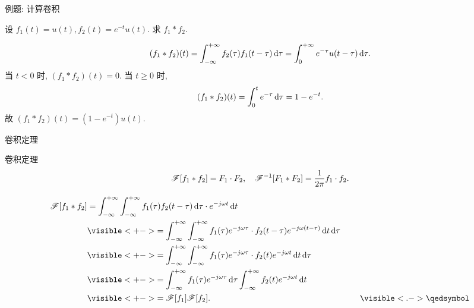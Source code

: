 \begin{frame}{例题: 计算卷积}
\begin{example}
设 $f_1(t)=u(t),f_2(t)=e^{-t}u(t)$.
求 $f_1\ast f_2$.
\end{example}
\begin{solution}
\vspace{-\baselineskip}
\[(f_1\ast f_2)(t)=\int_{-\infty}^{+\infty} f_2(\tau)f_1(t-\tau)\,\mathrm{d} \tau=\int_0^{+\infty} e^{-\tau}u(t-\tau)\,\mathrm{d} \tau.\]
\onslide<+->
当 $t<0$ 时, $(f_1\ast f_2)(t)=0$.
\onslide<+->
当 $t\ge0$ 时, 
\[(f_1\ast f_2)(t)=\int_0^t e^{-\tau}\,\mathrm{d} \tau=1-e^{-t}.\]
\onslide<+->
故 $(f_1\ast f_2)(t)=(1-e^{-t})u(t)$.
\end{solution}
\end{frame}


\begin{frame}{卷积定理}
\beqskip{0pt}
\begin{block}{卷积定理}
\[\mathscr{F}[f_1\ast f_2]=F_1\cdot F_2,\quad
\mathscr{F}^{-1}[F_1\ast F_2]=\frac1{2\pi}f_1\cdot f_2.\]
\vspace{-8pt}
\end{block}
\begin{proofs}
\begin{align*}
\msf[f_1\ast f_2]&=\int_{-\infty}^{+\infty}\int_{-\infty}^{+\infty}f_1(\tau)f_2(t-\tau)\diff \tau \cdot e^{-j\omega t}\diff t\\
&\visible<+->{=\int_{-\infty}^{+\infty}\int_{-\infty}^{+\infty}f_1(\tau)e^{-j\omega \tau}\cdot f_2(t-\tau)e^{-j\omega (t-\tau)}\diff t\diff \tau}\\
&\visible<+->{=\int_{-\infty}^{+\infty}\int_{-\infty}^{+\infty}f_1(\tau)e^{-j\omega \tau}\cdot f_2(t)e^{-j\omega t}\diff t\diff \tau}\\
&\visible<+->{=\int_{-\infty}^{+\infty}f_1(\tau)e^{-j\omega \tau}\diff\tau\int_{-\infty}^{+\infty}f_2(t)e^{-j\omega t}\diff t}\\
&\visible<+->{=\msf[f_1]\msf[f_2].}\hspace{180pt}\mqed
\end{align*}
\end{proofs}
\endgroup
\end{frame}


